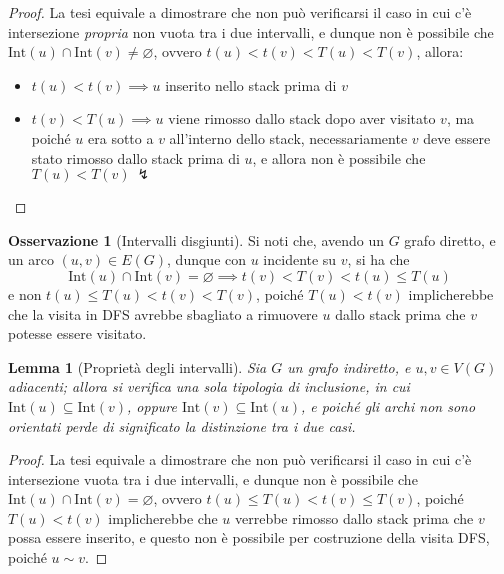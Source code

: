 \documentclass[14pt]{extreport}
\newtheorem{lemma}{Lemma}[subsection]
\theoremstyle{definition}
\theoremstyle{definition}
\newtheorem{remark}{Osservazione}[subsection]
\begin{document}
\begin{proof}
    La tesi equivale a dimostrare che non può verificarsi il caso in cui c'è intersezione \textit{propria} non vuota tra i due intervalli, e dunque non è possibile che $\mathrm{Int}(u) \cap \mathrm{Int}(v) \neq \varnothing$, ovvero $t(u) < t(v) < T(u) < T(v)$, allora:

    \begin{itemize}
        \item $t(u) < t(v) \implies u$ inserito nello stack prima di $v$
        \item $t(v) < T(u) \implies u$ viene rimosso dallo stack dopo aver visitato $v$, ma poiché $u$ era sotto a $v$ all'interno dello stack, necessariamente $v$ deve essere stato rimosso dallo stack prima di $u$, e allora non è possibile che $T(u) < T(v) \ \lightning$
    \end{itemize}
\end{proof}

\begin{remark}[Intervalli disgiunti]
    Si noti che, avendo un $G$ grafo diretto, e un arco $(u, v) \in E(G)$, dunque con $u$ incidente su $v$, si ha che $$\mathrm{Int}(u) \cap \mathrm{Int}(v) = \varnothing \implies t(v) < T(v) < t(u) \le T(u)$$ e non $t(u) \le T(u) < t(v) < T(v)$, poiché $T(u) < t(v)$ implicherebbe che la visita in DFS avrebbe sbagliato a rimuovere $u$ dallo stack prima che $v$ potesse essere visitato.
\end{remark}

\begin{lemma}[Proprietà degli intervalli]
    Sia $G$ un grafo indiretto, e $u, v \in V(G)$ adiacenti; allora si verifica una sola tipologia di inclusione, in cui $\mathrm{Int}(u) \subseteq \mathrm{Int}(v)$, oppure $\mathrm{Int}(v) \subseteq \mathrm{Int}(u)$, e poiché gli archi non sono orientati perde di significato la distinzione tra i due casi.
\end{lemma}

\begin{proof}
    La tesi equivale a dimostrare che non può verificarsi il caso in cui c'è intersezione vuota tra i due intervalli, e dunque non è possibile che $\mathrm{Int}(u) \cap \mathrm{Int}(v) = \varnothing$, ovvero $t(u) \le T(u) < t(v) \le T(v)$, poiché $T(u) < t(v)$ implicherebbe che $u$ verrebbe rimosso dallo stack prima che $v$ possa essere inserito, e questo non è possibile per costruzione della visita DFS, poiché $u \sim v$.
\end{proof}
\end{document}
